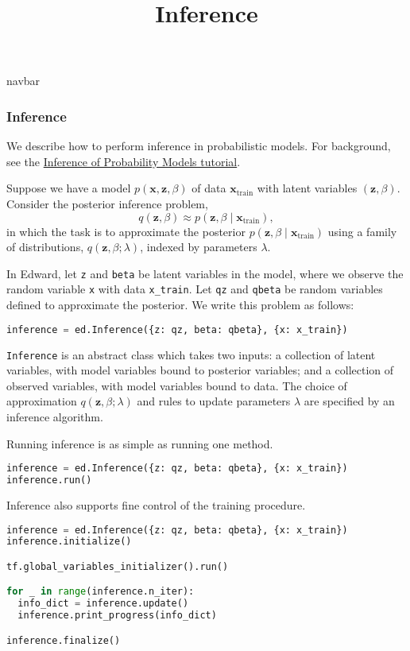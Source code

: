 \title{Inference}

{{navbar}}

\subsubsection{Inference}

We describe how to perform inference in probabilistic models.
For background, see the
\href{/tutorials/inference} {Inference of Probability Models
tutorial}.

Suppose we have a model $p(\mathbf{x}, \mathbf{z}, \beta)$ of data $\mathbf{x}_{\text{train}}$ with latent variables $(\mathbf{z}, \beta)$.
Consider the posterior inference problem,
\begin{equation*}
q(\mathbf{z}, \beta)\approx p(\mathbf{z}, \beta\mid \mathbf{x}_{\text{train}}),
\end{equation*}
in which the task is to approximate the posterior
$p(\mathbf{z}, \beta\mid \mathbf{x}_{\text{train}})$
using a family of distributions, $q(\mathbf{z},\beta; \lambda)$,
indexed by parameters $\lambda$.

In Edward, let \texttt{z} and \texttt{beta} be latent variables in the model,
where we observe the random variable \texttt{x} with
data \texttt{x_train}.
Let \texttt{qz} and \texttt{qbeta} be random variables defined to
approximate the posterior.
We write this problem as follows:

\begin{lstlisting}[language=Python]
inference = ed.Inference({z: qz, beta: qbeta}, {x: x_train})
\end{lstlisting}

\texttt{Inference} is an abstract class which
takes two inputs: a collection of latent variables, with model
variables bound to posterior variables; and a collection of observed
variables, with model variables bound to data.
The choice of approximation $q(\mathbf{z}, \beta; \lambda)$ and rules
to update parameters $\lambda$ are specified by an inference
algorithm.

Running inference is as simple as running one method.

\begin{lstlisting}[language=Python]
inference = ed.Inference({z: qz, beta: qbeta}, {x: x_train})
inference.run()
\end{lstlisting}

Inference also supports fine control of the training procedure.

\begin{lstlisting}[language=Python]
inference = ed.Inference({z: qz, beta: qbeta}, {x: x_train})
inference.initialize()

tf.global_variables_initializer().run()

for _ in range(inference.n_iter):
  info_dict = inference.update()
  inference.print_progress(info_dict)

inference.finalize()
\end{lstlisting}

